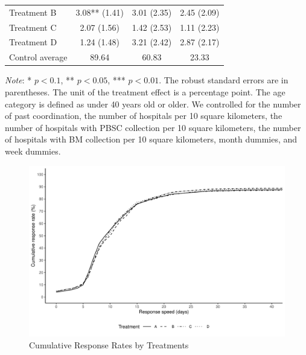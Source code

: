\documentclass [12pt, a4paper]{article}
\begin{document}
\begin{table}[H]
\begin{threeparttable}
\begin{tabular}[t]{lccc}
\hspace{1em}Treatment B & 3.08** (1.41) & 3.01 (2.35) & 2.45 (2.09)\\
\hspace{1em}Treatment C & 2.07 (1.56) & 1.42 (2.53) & 1.11 (2.23)\\
\hspace{1em}Treatment D & 1.24 (1.48) & 3.21 (2.42) & 2.87 (2.17)\\
\hspace{1em}Control average & 89.64 & 60.83 & 23.33\\
\bottomrule
\end{tabular}
\begin{tablenotes}
\item \emph{Note}: * $p < 0.1$, ** $p < 0.05$, *** $p < 0.01$. The robust standard errors are in parentheses. The unit of the treatment effect is a percentage point. The age category is defined as under 40 years old or older. We controlled for the number of past coordination, the number of hospitals per 10 square kilometers, the number of hospitals with PBSC collection per 10 square kilometers, the number of hospitals with BM collection per 10 square kilometers, month dummies, and week dummies.
\end{tablenotes}
\end{threeparttable}
\end{table}

\begin{figure}[H]
\includegraphics{JMDP RCT - Main Document_files/figure-latex/cumulative-response-rate-1} \caption{Cumulative Response Rates by Treatments}\label{fig:cumulative-response-rate}
\end{figure}
\end{document}
